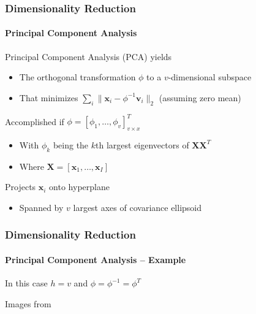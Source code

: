 \documentclass[xetex,professionalfont]{beamer}
\renewcommand{\vec}[1]{\ensuremath{\mathbf{#1}}}
\newcommand{\vv}{\vec{v}}
\newcommand{\vx}{\vec{x}}
\newcommand{\vX}{\vec{X}}
\begin{document}

\begin{frame}
\frametitle{Dimensionality Reduction}
\framesubtitle{Principal Component Analysis}

Principal Component Analysis (PCA) yields
\begin{itemize}
	\item The orthogonal transformation $\phi$ to a $v$-dimensional subspace
	\item That minimizes $\sum_i\lVert\vx_i-\phi^{-1}\vv_i\rVert_2$ (assuming zero mean) %
\end{itemize}

\bigskip
Accomplished if $\phi=[\phi_1,\dots,\phi_v]^T_{v\times x}$ %
\begin{itemize}
	\item With $\phi_k$ being the $k$th largest eigenvectors of $\vX\vX^T$
	\item Where $\vX=[\vx_1,\dots,\vx_I]$
\end{itemize}

\bigskip
Projects $\vx_i$ onto hyperplane
\begin{itemize}
	\item Spanned by $v$ largest axes of covariance ellipsoid
\end{itemize}

\end{frame}


\begin{frame}
\frametitle{Dimensionality Reduction}
\framesubtitle{Principal Component Analysis -- Example}

In this case $h=v$ and $\phi=\phi^{-1}=\phi^T$

\begin{center}
	{\centering Images from \cite{prince12}}
\end{center}

\end{frame}
\end{document}

